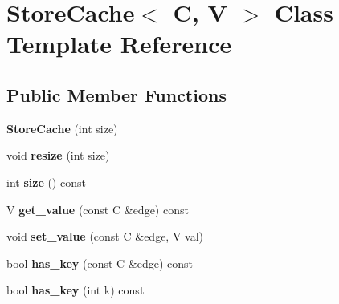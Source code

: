\hypertarget{classStoreCache}{
\section{StoreCache$<$ C, V $>$ Class Template Reference}
\label{classStoreCache}
}
\subsection*{Public Member Functions}
\begin{DoxyCompactItemize}
\item 
\hypertarget{classStoreCache_adeb02113caf8141430705ec5bab08a54}{
{\bfseries StoreCache} (int size)}
\label{classStoreCache_adeb02113caf8141430705ec5bab08a54}

\item 
\hypertarget{classStoreCache_a5aaafba803337cf3547159a6ac70a0ab}{
void {\bfseries resize} (int size)}
\label{classStoreCache_a5aaafba803337cf3547159a6ac70a0ab}

\item 
\hypertarget{classStoreCache_aa4673d48544458b6b05770fe5970d961}{
int {\bfseries size} () const }
\label{classStoreCache_aa4673d48544458b6b05770fe5970d961}

\item 
\hypertarget{classStoreCache_a455dbf75e40300745b354fdcc039279a}{
V {\bfseries get\_\-value} (const C \&edge) const }
\label{classStoreCache_a455dbf75e40300745b354fdcc039279a}

\item 
\hypertarget{classStoreCache_a23309f685f0ba18912dcc2e8643de932}{
void {\bfseries set\_\-value} (const C \&edge, V val)}
\label{classStoreCache_a23309f685f0ba18912dcc2e8643de932}

\item 
\hypertarget{classStoreCache_aa1289fedb472667dfa926c1e00f22b95}{
bool {\bfseries has\_\-key} (const C \&edge) const }
\label{classStoreCache_aa1289fedb472667dfa926c1e00f22b95}

\item 
\hypertarget{classStoreCache_ad358ce23080bb52db50a55db583f1bba}{
bool {\bfseries has\_\-key} (int k) const }
\label{classStoreCache_ad358ce23080bb52db50a55db583f1bba}

\end{DoxyCompactItemize}
